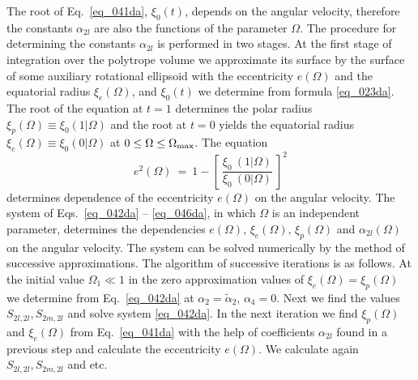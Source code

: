 \documentclass{caosp308}
\begin{document}
The root of  Eq.~\eqref{eq_041da}, $\xi_0(t)$, depends on the angular velocity, therefore the constants $\alpha_{2l}$ are also the functions of the parameter $\Omega$. The procedure for determining the constants $\alpha_{2l}$ is performed in two stages. At the first stage of integration over the polytrope volume we approximate its surface by the surface of some auxiliary rotational ellipsoid with the eccentricity $e(\Omega)$ and the equatorial radius $\xi_e(\Omega)$, and $\xi_0(t)$ we determine from formula \eqref{eq_023da}. The root of the equation at $t=1$ determines the polar radius $\xi_p (\Omega)\equiv \xi_0 (1|\Omega)$ and the root at $t=0$ yields the equatorial radius $\xi_e (\Omega)\equiv \xi_0 (0|\Omega)$ at $0\leq \Omega\leq \Omega_{\rm max}$. The equation
\begin{equation}
\label{eq_046da}
e^2 (\Omega)\:=\:1 -\left[\:\frac{\xi_0\:(1|\Omega)}{\xi_0\:(0|\Omega)}\:\right]^2
\end{equation}
determines dependence of the eccentricity $e (\Omega)$ on the angular velocity. The system of Eqs.~\eqref{eq_042da} -- \eqref{eq_046da}, in which $\Omega$ is an independent  parameter, determines the dependencies $e(\Omega),\,\xi_{e}(\Omega),\,\xi_{p}(\Omega)$ and $\alpha_{2l}(\Omega)$ on the angular velocity. The system can be solved numerically by the method of successive approximations.
The algorithm of successive iterations is as follows. At the initial value $\Omega_1\ll1$ in the zero approximation values of $\xi_{e}(\Omega)=\xi_{p}(\Omega)$ we determine from Eq.~\eqref{eq_042da} at $\alpha_{2}=\tilde\alpha_2$, $\alpha_4 =0$. Next we find the values $S_{2l,2l},S_{2m,2l}$ and solve system \eqref{eq_042da}. In the next iteration we find $\xi_{p}(\Omega)$ and $\xi_{e}(\Omega)$ from Eq.~\eqref{eq_041da} with the help of coefficients $\alpha_{2l}$ found in a previous step and calculate the eccentricity $e(\Omega)$. We calculate again  $S_{2l,2l},S_{2m, 2l}$ and etc.
\end{document}
